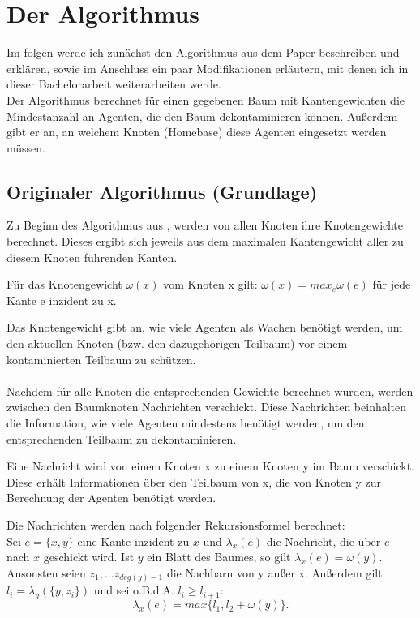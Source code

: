 \section{Der Algorithmus}\label{kap_algorithmus}
Im folgen werde ich zunächst den Algorithmus aus dem Paper \cite{cima_paper} beschreiben und erklären, sowie im Anschluss ein paar Modifikationen erläutern, mit denen ich in dieser Bachelorarbeit weiterarbeiten werde.\\
Der Algorithmus berechnet für einen gegebenen Baum mit Kantengewichten die Mindestanzahl an Agenten, die den Baum dekontaminieren können. Außerdem gibt er an, an welchem Knoten (Homebase) diese Agenten eingesetzt werden müssen.



\subsection{Originaler Algorithmus (Grundlage)}\label{paperAlgoChapter}

Zu Beginn des Algorithmus aus \cite{cima_paper}, werden von allen Knoten ihre Knotengewichte berechnet. Dieses ergibt sich jeweils aus dem maximalen Kantengewicht aller zu diesem Knoten führenden Kanten. 

\begin{mydef}
	Für das Knotengewicht $\omega(x)$ vom Knoten x gilt: $\omega(x) = max_{e} \omega(e)$ für jede Kante e inzident zu x.
\end{mydef}

Das Knotengewicht gibt an, wie viele Agenten als Wachen benötigt werden, um den aktuellen Knoten (bzw. den dazugehörigen Teilbaum) vor einem kontaminierten Teilbaum zu schützen.
\\
\\
Nachdem für alle Knoten die entsprechenden Gewichte berechnet wurden, werden zwischen den Baumknoten Nachrichten verschickt. Diese Nachrichten beinhalten die Information, wie viele Agenten mindestens benötigt werden, um den entsprechenden Teilbaum zu dekontaminieren.  

\begin{mydef}\label{def_nachricht}
	Eine Nachricht wird von einem Knoten x zu einem Knoten y im Baum verschickt. Diese erhält Informationen über den Teilbaum von x, die von Knoten y zur Berechnung der Agenten benötigt werden.
\end{mydef}

Die Nachrichten werden nach folgender Rekursionsformel \cite{cima_paper} berechnet:\\
Sei $e = \{x, y\}$ eine Kante inzident zu $x$ und $\lambda_{x}(e)$ die Nachricht, die über $e$ nach $x$ geschickt wird. Ist $y$ ein Blatt des Baumes, so gilt $\lambda_{x}(e) = \omega(y)$. Ansonsten seien $z_{1}, ... z_{deg(y)-1}$ die Nachbarn von y außer x. Außerdem gilt $l_{i} = \lambda_{y}(\{y, z_{i}\})$ und sei o.B.d.A. $l_{i} \geq l_{i+1}$: $$\lambda_{x}(e) = max \{l_{1}, l_{2} + \omega(y)\}.$$



